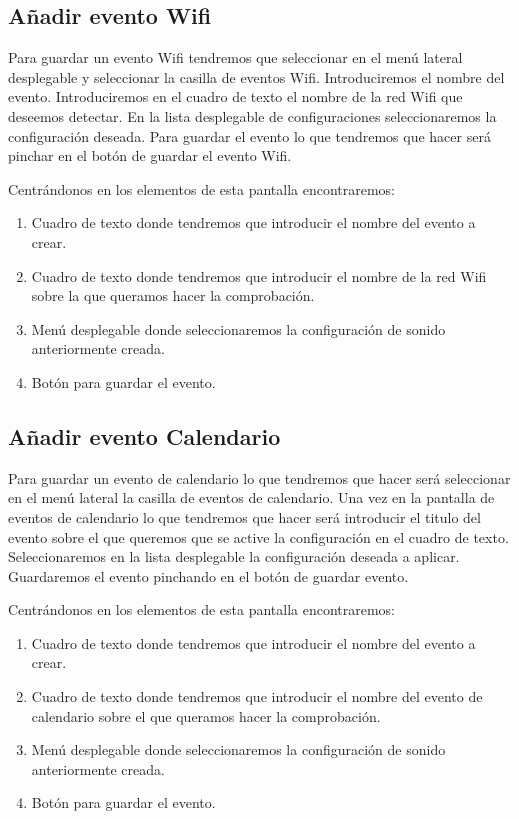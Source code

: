 \subsection{Añadir evento Wifi}

Para guardar un evento Wifi tendremos que seleccionar en el menú lateral desplegable y seleccionar la casilla de eventos Wifi.
Introduciremos el nombre del evento.
Introduciremos en el cuadro de texto el nombre de la red Wifi que deseemos detectar.
En la lista desplegable de configuraciones seleccionaremos la configuración deseada.
Para guardar el evento lo que tendremos que hacer será pinchar en el botón de guardar el evento Wifi.

Centrándonos en los elementos de esta pantalla encontraremos:
\begin{enumerate}
\item Cuadro de texto donde tendremos que introducir el nombre del evento a crear.
\item Cuadro de texto donde tendremos que introducir el nombre de la red Wifi sobre la que queramos hacer la comprobación.
\item Menú desplegable donde seleccionaremos la configuración de sonido anteriormente creada.
\item Botón para guardar el evento.
\end{enumerate}

\subsection{Añadir evento Calendario}
Para guardar un evento de calendario lo que tendremos que hacer será seleccionar en el menú lateral la casilla de eventos de calendario.
Una vez en la pantalla de eventos de calendario lo que tendremos que hacer será introducir el titulo del evento sobre el que queremos que se active la configuración en el cuadro de texto.
Seleccionaremos en la lista desplegable la configuración deseada a aplicar.
Guardaremos el evento pinchando en el botón de guardar evento.

Centrándonos en los elementos de esta pantalla encontraremos:
\begin{enumerate}
\item Cuadro de texto donde tendremos que introducir el nombre del evento a crear.
\item Cuadro de texto donde tendremos que introducir el nombre del evento de calendario sobre el que queramos hacer la comprobación.
\item Menú desplegable donde seleccionaremos la configuración de sonido anteriormente creada.
\item Botón para guardar el evento.
\end{enumerate}

